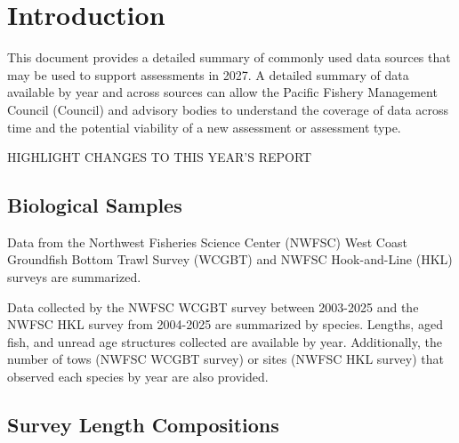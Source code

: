 \documentclass[11pt,
  letterpaper,
]{article}
\begin{document}
\newcommand{\lt}{\ensuremath <}
\newcommand{\gt}{\ensuremath >}

\pagebreak
{}
\setcounter{page}{1}

\renewcommand{\thetable}{\roman{table}}
\renewcommand{\thefigure}{\roman{figure}}

\setlength\parskip{0.5em plus 0.1em minus 0.2em}

\pagebreak
\setlength{\parskip}{5mm plus1mm minus1mm}
\setcounter{page}{1}
\renewcommand{\thefigure}{\arabic{figure}}
\renewcommand{\thetable}{\arabic{table}}
\setcounter{table}{0}
\setcounter{figure}{0}

\section{Introduction}\label{introduction}

This document provides a detailed summary of commonly used data sources that may be used to support assessments in 2027. A detailed summary of data available by year and across sources can allow the Pacific Fishery Management Council (Council) and advisory bodies to understand the coverage of data across time and the potential viability of a new assessment or assessment type.

HIGHLIGHT CHANGES TO THIS YEAR'S REPORT

\subsection{Biological Samples}\label{biological-samples}

Data from the Northwest Fisheries Science Center (NWFSC) West Coast Groundfish Bottom Trawl Survey (WCGBT) and NWFSC Hook-and-Line (HKL) surveys are summarized.

Data collected by the NWFSC WCGBT survey between 2003-2025 and the NWFSC HKL survey from 2004-2025 are summarized by species. Lengths, aged fish, and unread age structures collected are available by year. Additionally, the number of tows (NWFSC WCGBT survey) or sites (NWFSC HKL survey) that observed each species by year are also provided.

\subsection{Survey Length Compositions}\label{survey-length-compositions}
\end{document}
